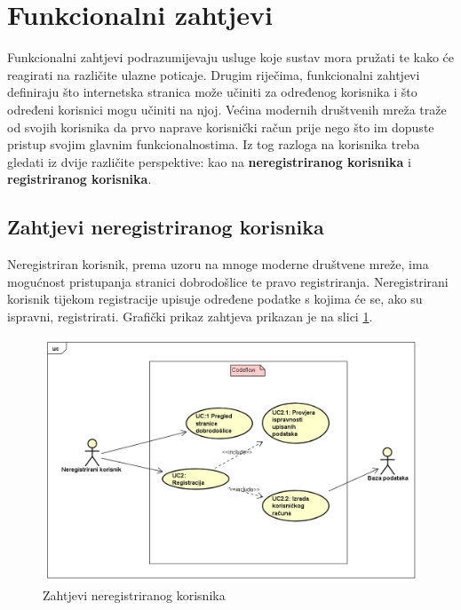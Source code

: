 \documentclass[times, utf8, zavrsni, numeric]{fer}
\begin{document}
		\section{Funkcionalni zahtjevi}
		Funkcionalni zahtjevi podrazumijevaju usluge koje sustav mora pružati te kako će reagirati na različite ulazne poticaje. Drugim riječima, funkcionalni zahtjevi definiraju što internetska stranica može učiniti za određenog korisnika i što određeni korisnici mogu učiniti na njoj.
		Većina modernih društvenih mreža traže od svojih korisnika da prvo naprave korisnički račun prije nego što im dopuste pristup svojim glavnim funkcionalnostima. Iz tog razloga na korisnika treba gledati iz dvije različite perspektive: kao na \textbf{neregistriranog korisnika} i \textbf{registriranog korisnika}.
	
			\subsection{Zahtjevi neregistriranog korisnika}
			Neregistriran korisnik, prema uzoru na mnoge moderne društvene mreže, ima mogućnost pristupanja stranici dobrodošlice te pravo registriranja. Neregistrirani korisnik tijekom registracije upisuje određene podatke s kojima će se, ako su ispravni, registrirati. Grafički prikaz zahtjeva prikazan je na slici \ref{fig:zahtjevi-nereg}.
			\begin{figure}[H]
				\centering
				\includegraphics[width=\linewidth]{pictures/zahtjevi/nereg_korisnik.png}
				\caption{Zahtjevi neregistriranog korisnika}
				\label{fig:zahtjevi-nereg}
			\end{figure}
	
\end{document}
